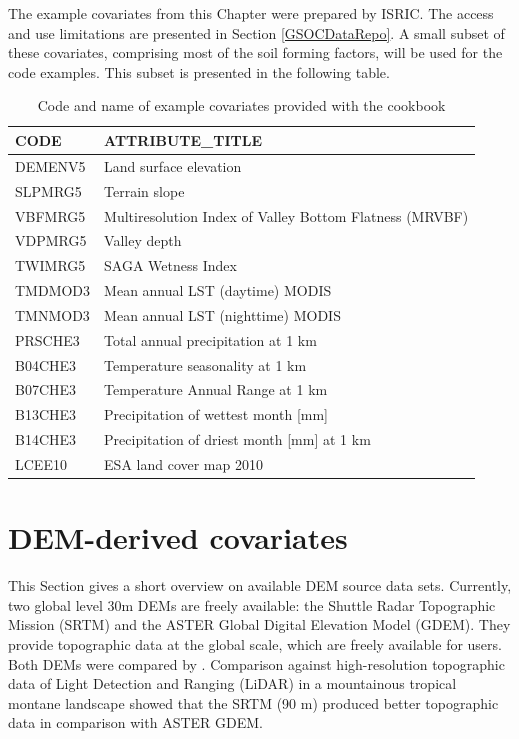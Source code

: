 \documentclass[10pt,b5paper,]{book}
\theoremstyle{definition}
\theoremstyle{definition}
\theoremstyle{definition}
\theoremstyle{remark}
\begin{document}
The example covariates from this Chapter were prepared by ISRIC. The
access and use limitations are presented in Section \ref{GSOCDataRepo}.
A small subset of these covariates, comprising most of the soil forming
factors, will be used for the code examples. This subset is presented in
the following table.

\begin{table}

\caption{\label{tab:covariates}Code and name of example covariates provided with the cookbook}
\centering
\begin{tabular}[t]{ll}
\toprule
CODE & ATTRIBUTE\_TITLE\\
\midrule
DEMENV5 & Land surface elevation\\
SLPMRG5 & Terrain slope\\
VBFMRG5 & Multiresolution Index of Valley Bottom Flatness (MRVBF)\\
VDPMRG5 & Valley depth\\
TWIMRG5 & SAGA Wetness Index\\
\addlinespace
TMDMOD3 & Mean annual LST (daytime) MODIS\\
TMNMOD3 & Mean annual LST (nighttime) MODIS\\
PRSCHE3 & Total annual precipitation at 1 km\\
B04CHE3 & Temperature seasonality at 1 km\\
B07CHE3 & Temperature Annual Range at 1 km\\
\addlinespace
B13CHE3 & Precipitation of wettest month [mm]\\
B14CHE3 & Precipitation of driest month [mm] at 1 km\\
LCEE10 & ESA land cover map 2010\\
\bottomrule
\end{tabular}
\end{table}

\hypertarget{dem-derived-covariates}{%
\section{DEM-derived covariates}\label{dem-derived-covariates}}

This Section gives a short overview on available DEM source data sets.
Currently, two global level 30m DEMs are freely available: the Shuttle
Radar Topographic Mission (SRTM) and the ASTER Global Digital Elevation
Model (GDEM). They provide topographic data at the global scale, which
are freely available for users. Both DEMs were compared by
\citet{Wong2014}. Comparison against high-resolution topographic data of
Light Detection and Ranging (LiDAR) in a mountainous tropical montane
landscape showed that the SRTM (90 m) produced better topographic data
in comparison with ASTER GDEM.
\end{document}
